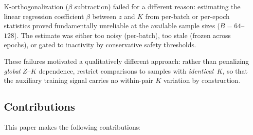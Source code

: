K-orthogonalization ($\beta$ subtraction) failed for a different reason: estimating the linear regression coefficient $\beta$ between $z$ and $K$ from per-batch or per-epoch statistics proved fundamentally unreliable at the available sample sizes ($B{=}64$--$128$). The estimate was either too noisy (per-batch), too stale (frozen across epochs), or gated to inactivity by conservative safety thresholds.

These failures motivated a qualitatively different approach: rather than penalizing \emph{global} $Z$--$K$ dependence, restrict comparisons to samples with \emph{identical}~$K$, so that the auxiliary training signal carries no within-pair $K$ variation by construction.

\subsection{Contributions}

This paper makes the following contributions:

